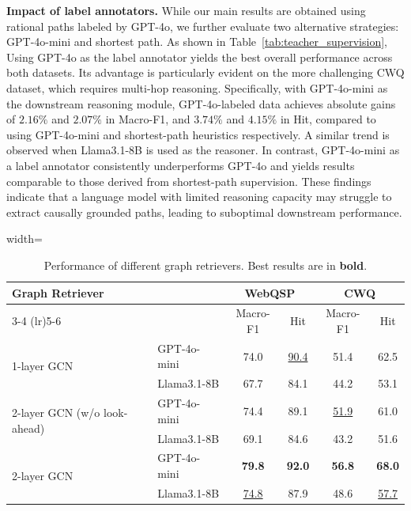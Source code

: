 \documentclass{article}
\theoremstyle{plain}
\theoremstyle{definition}
\theoremstyle{remark}
\newcommand{\tb}[1]{\textbf{#1}}
\begin{document}
\tb{Impact of label annotators.} While our main results are obtained using rational paths labeled by GPT-4o, we further evaluate two alternative strategies: GPT-4o-mini and shortest path.
As shown in Table~\ref{tab:teacher_supervision}, Using GPT-4o as the label annotator yields the best overall performance across both datasets. Its advantage is particularly evident on the more challenging CWQ dataset, which requires multi-hop reasoning. Specifically, with GPT-4o-mini as the downstream reasoning module, GPT-4o-labeled data achieves absolute gains of $2.16\%$ and $2.07\%$ in Macro-F1, and $3.74\%$ and $4.15\%$ in Hit, compared to using GPT-4o-mini and shortest-path heuristics respectively. A similar trend is observed when Llama3.1-8B is used as the reasoner.
In contrast, GPT-4o-mini as a label annotator consistently underperforms GPT-4o and yields results comparable to those derived from shortest-path supervision. These findings indicate that a language model with limited reasoning capacity may struggle to extract causally grounded paths, leading to suboptimal downstream performance.
\begin{table}  
    \vspace{-0.1cm}
    \caption{
        Performance of different graph retrievers. Best results are in \textbf{bold}.
    }
    \label{tab:graph_retriever}
    \centering
    \begin{adjustbox}{width=\linewidth}
        \begin{tabular}{llcccc}
            \toprule
            \multirow{2}{*}{Graph Retriever} &  & \multicolumn{2}{c}{WebQSP} & \multicolumn{2}{c}{CWQ} \\
            \cmidrule(lr){3-4} \cmidrule(lr){5-6}
             & & Macro-F1 & Hit & Macro-F1 & Hit \\
            \midrule
            \multirow{2}{*}{1-layer GCN} 
                 & GPT-4o-mini  & 74.0 & \underline{90.4} & 51.4 & 62.5 \\
                 & Llama3.1-8B  & 67.7 & 84.1 & 44.2 & 53.1 \\
            \midrule
            \multirow{2}{*}{2-layer GCN (w/o look-ahead)} 
                 & GPT-4o-mini  & 74.4 & 89.1 & \underline{51.9} & 61.0 \\
                 & Llama3.1-8B  & 69.1 & 84.6 & 43.2 & 51.6 \\
            \midrule
            \multirow{2}{*}{2-layer GCN} 
                 & GPT-4o-mini  & \textbf{79.8} & \textbf{92.0} & \textbf{56.8} & \textbf{68.0} \\
                 & Llama3.1-8B  & \underline{74.8} & 87.9 & 48.6 & \underline{57.7} \\
            \bottomrule
        \end{tabular}
    \end{adjustbox}
\end{table}
\end{document}

